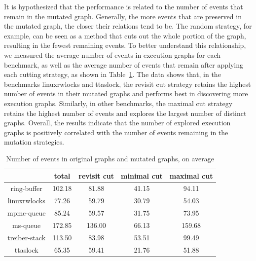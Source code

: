 It is hypothesized that the performance is related to the number of events that remain in the mutated graph. Generally, the more events that are preserved in the mutated graph, the closer their relations tend to be. The random strategy, for example, can be seen as a method that cuts out the whole portion of the graph, resulting in the fewest remaining events. To better understand this relationship, we measured the average number of events in execution graphs for each benchmark, as well as the average number of events that remain after applying each cutting strategy, as shown in Table~\ref{genmc:average-events}. The data shows that, in the benchmarks linuxrwlocks and ttaslock, the revisit cut strategy retains the highest number of events in their mutated graphs and performs best in discovering more execution graphs. Similarly, in other benchmarks, the maximal cut strategy retains the highest number of events and explores the largest number of distinct graphs. Overall, the results indicate that the number of explored execution graphs is positively correlated with the number of events remaining in the mutation strategies.



\begin{table}[h!]
	\centering
	\begin{tabular}{|c|cccc|}
		\hline
		\diagbox{Benchmark}{ Strategy} & total  & revisit cut & minimal cut & maximal cut \\ \hline
		ring-buffer                    & 102.18 & 81.88       & 41.15       & 94.11       \\ \hline
		linuxrwlocks                   & 77.26  & 59.79       & 30.79       & 54.03       \\ \hline
		mpmc-queue                     & 85.24  & 59.57       & 31.75       & 73.95       \\ \hline
		ms-queue                       & 172.85 & 136.00      & 66.13       & 159.68      \\ \hline
		treiber-stack                  & 113.50 & 83.98       & 53.51       & 99.49       \\ \hline
		ttaslock                       & 65.35  & 59.41       & 21.76       & 51.88       \\ \hline
	\end{tabular}
	\label{genmc:average-events}
	\caption{Number of events in original graphs and mutated graphs, on average}
\end{table}





